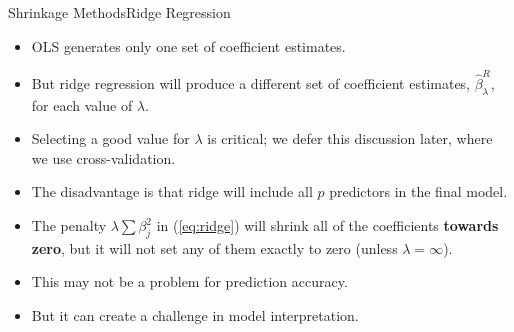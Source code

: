 \begin{frame}{Shrinkage Methods}{Ridge Regression}
    \begin{itemize}
        \item OLS generates only one set of coeﬃcient estimates. \pause 
        
        \item But ridge regression will produce a diﬀerent set of coeﬃcient estimates, $\hat{\beta}^R_\lambda$, for each value of $\lambda$. \pause 
        
        \item Selecting a good value for $\lambda$ is critical; we defer this discussion later, where we use cross-validation. \pause 

        \item The disadvantage is that ridge will include all $p$ predictors in the final model. \pause 
        
        \item The penalty $\lambda \sum \beta_j^2$ in (\ref{eq:ridge}) will shrink all of the coeﬃcients \textbf{towards zero}, but it will not set any of them exactly to zero (unless $\lambda = \infty$). \pause 
        
        \item This may not be a problem for prediction accuracy. \pause 
        
        \item But it can create a challenge in model interpretation.
    \end{itemize}
\end{frame}